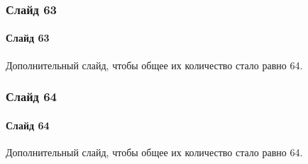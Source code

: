 \documentclass[aspectratio=169]{beamer}
\begin{document}
\begin{frame}
\frametitle{Слайд 63}
\framesubtitle{Слайд 63}
\justifying
\small

Дополнительный слайд, чтобы общее их количество стало равно 64.

\end{frame}

\begin{frame}
\frametitle{Слайд 64}
\framesubtitle{Слайд 64}
\justifying
\small

Дополнительный слайд, чтобы общее их количество стало равно 64.

\end{frame}
\end{document}
